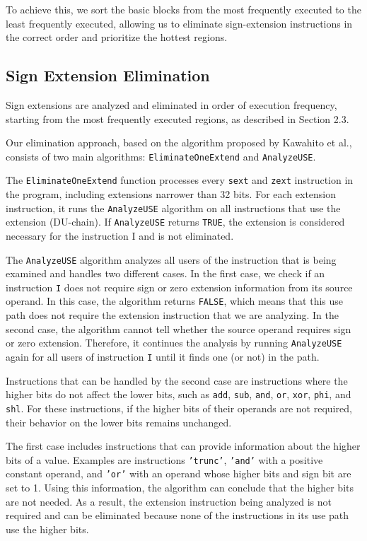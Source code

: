 To achieve this, we sort the basic blocks from the most frequently executed to the least frequently executed, allowing us to eliminate sign-extension instructions in the correct order and prioritize the hottest regions.

\subsection{Sign Extension Elimination}

Sign extensions are analyzed and eliminated in order of execution frequency, starting from the most frequently executed regions, as described in Section 2.3.

Our elimination approach, based on the algorithm proposed by Kawahito et al., consists of two main algorithms: \texttt{EliminateOneExtend} and \texttt{AnalyzeUSE}.




The \texttt{EliminateOneExtend} function processes every \texttt{sext} and \texttt{zext} instruction in the program, including extensions narrower than 32 bits. For each extension instruction, it runs the \texttt{AnalyzeUSE} algorithm on all instructions that use the extension (DU-chain). If \texttt{AnalyzeUSE} returns \texttt{TRUE}, the extension is considered necessary for the instruction I and is not eliminated.

The \texttt{AnalyzeUSE} algorithm analyzes all users of the instruction that is being examined and handles two different cases. In the first case, we check if an instruction \texttt{I} does not require sign or zero extension information from its source operand. In this case, the algorithm returns \texttt{FALSE}, which means that this use path does not require the extension instruction that we are analyzing. In the second case, the algorithm cannot tell whether the source operand requires sign or zero extension. Therefore, it continues the analysis by running \texttt{AnalyzeUSE} again for all users of instruction \texttt{I} until it finds one (or not) in the path.

Instructions that can be handled by the second case are instructions where the higher bits do not affect the lower bits, such as \texttt{add}, \texttt{sub}, \texttt{and}, \texttt{or}, \texttt{xor}, \texttt{phi}, and \texttt{shl}. For these instructions, if the higher bits of their operands are not required, their behavior on the lower bits remains unchanged.

The first case includes instructions that can provide information about the higher bits of a value. Examples are instructions \texttt{'trunc'}, \texttt{'and'} with a positive constant operand, and \texttt{'or'} with an operand whose higher bits and sign bit are set to 1. Using this information, the algorithm can conclude that the higher bits are not needed. As a result, the extension instruction being analyzed is not required and can be eliminated because none of the instructions in its use path use the higher bits.

